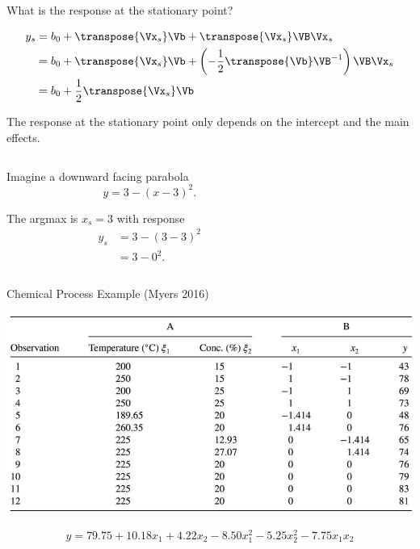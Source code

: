 \documentclass[10pt]{beamer}
\begin{document}
\begin{frame}{What is the response at the stationary point?}

\begin{align*}
	y_s &= b_0 + \transpose{\Vx_s}\Vb + \transpose{\Vx_s}\VB\Vx_s \\
		&= b_0 + \transpose{\Vx_s}\Vb + \left(-\frac{1}{2}\transpose{\Vb}\VB^{-1}\right)\VB\Vx_s \\
		&= b_0 + \frac{1}{2}\transpose{\Vx_s}\Vb
\end{align*}

\pause
The response at the stationary point only depends on the intercept and the main effects.

\pause
\bigskip
\begin{columns}
\begin{column}{0.5\textwidth}
	Imagine a downward facing parabola \[y = 3 - (x-3)^2.\]
	
	The argmax is $x_s=3$ with response 
	\begin{align*} 
		y_s &= 3 - (3-3)^2 \\
		 &= 3 - 0^2.
	\end{align*}
\end{column}	

\begin{column}{0.5\textwidth}
\end{column}	
\end{columns}	
\end{frame}

\begin{frame}{Chemical Process Example (Myers 2016)}

\includegraphics[width=\textwidth]{figures/rsm_chemical.png}
	
\pause
\[ y = 79.75 + 10.18x_1 + 4.22x_2 - 8.50x_1^2 - 5.25x_2^2 - 7.75x_1x_2 \]
\end{frame}
\end{document}
